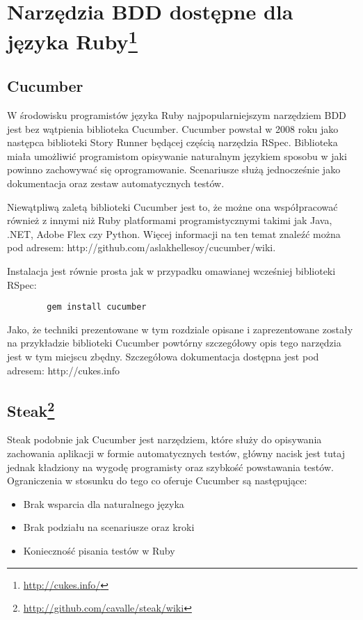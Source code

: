  \section[Narzędzia BDD dostępne dla języka Ruby]{Narzędzia BDD dostępne dla języka Ruby\footnote{\url{http://cukes.info/}\nocite{cucumber}}}
    \subsection{Cucumber}
      W środowisku programistów języka Ruby najpopularniejszym narzędziem BDD jest bez wątpienia biblioteka Cucumber. Cucumber powstał w 2008 roku jako następca biblioteki Story Runner będącej częścią narzędzia RSpec. Biblioteka miała umożliwić programistom opisywanie naturalnym językiem sposobu w jaki powinno zachowywać się oprogramowanie. Scenariusze służą jednocześnie jako dokumentacja oraz zestaw automatycznych testów. 
      
      Niewątpliwą zaletą biblioteki Cucumber jest to, że możne ona współpracować również z innymi niż Ruby platformami programistycznymi takimi jak Java, .NET, Adobe Flex czy Python. Więcej informacji na ten temat znaleźć można pod adresem: http://github.com/aslakhellesoy/cucumber/wiki.
      
      Instalacja jest równie prosta jak w przypadku omawianej wcześniej biblioteki RSpec:
      
      \begin{lstlisting}
        gem install cucumber
      \end{lstlisting}
      
      Jako, że techniki prezentowane w tym rozdziale opisane i zaprezentowane zostały na przykładzie biblioteki Cucumber powtórny szczegółowy opis tego narzędzia jest w tym miejscu zbędny. Szczegółowa dokumentacja dostępna jest pod adresem: http://cukes.info
      
    \subsection[Steak]{Steak\footnote{\url{http://github.com/cavalle/steak/wiki}}}
      Steak podobnie jak Cucumber jest narzędziem, które służy do opisywania zachowania aplikacji w formie automatycznych testów, główny nacisk jest tutaj jednak kładziony na wygodę programisty oraz szybkość powstawania testów. Ograniczenia w stosunku do tego co oferuje Cucumber są następujące:
      
      \begin{itemize}
        \item Brak wsparcia dla naturalnego języka
        \item Brak podziału na scenariusze oraz kroki
        \item Konieczność pisania testów w Ruby
      \end{itemize}
      
